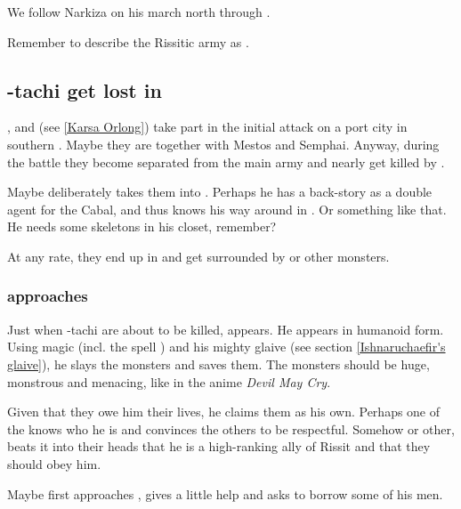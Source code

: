 We follow Narkiza on his march north through \Scyrum. 



Remember to describe the Rissitic army as .







\subsection{\Shilred-tachi get lost in \Nyx}
\Shilred{}, \Dzasselid{} and \KarsaOrlong{} (see \ref{Karsa Orlong}) take part in the initial attack on a port city in southern \Scyrum. Maybe they are together with Mestos and Semphai. Anyway, during the battle they become separated from the main army and nearly get killed by \banes. %

Maybe \Dzasselid{} deliberately takes them into \Nyx. Perhaps he has a back-story as a double agent for the Cabal, and thus knows his way around in \Nyx. Or something like that. He needs some skeletons in his closet, remember?

At any rate, they end up in \Nyx{} and get surrounded by \banes{} or other monsters. 






\subsubsection{\Ishnaruchaefir{} approaches}
Just when \Shilred-tachi are about to be killed, \Ishnaruchaefir{} appears. He appears in humanoid form. Using magic (incl. the spell ) and his mighty glaive (see section \ref{Ishnaruchaefir's glaive}), he slays the monsters and saves them. The monsters should be huge, monstrous and menacing, like in the anime \emph{Devil May Cry}. 

Given that they owe him their lives, he claims them as his own. Perhaps one of the \Gisshorns{} knows who he is and convinces the others to be respectful. Somehow or other, \Ishnaruchaefir{} beats it into their heads that he is a high-ranking ally of Rissit and that they should obey him. 

Maybe \Ishnaruchaefir{} first approaches \Narkiza{}, gives a little help and asks to borrow some of his men. 






